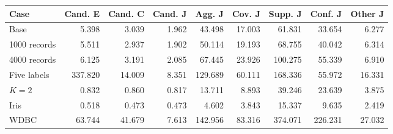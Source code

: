 \begin{table}
\label{tab:candidate-phases}
\begin{tabular}{lrrrrrrrr}
\toprule
Case & Cand. E & Cand. C & Cand. J & Agg. J & Cov. J & Supp. J & Conf. J & Other J \\
\midrule
Base & 5.398 & 3.039 & 1.962 & 43.498 & 17.003 & 61.831 & 33.654 & 6.277 \\
1000 records & 5.511 & 2.937 & 1.902 & 50.114 & 19.193 & 68.755 & 40.042 & 6.314 \\
4000 records & 6.125 & 3.191 & 2.085 & 67.445 & 23.926 & 100.275 & 55.339 & 6.910 \\
Five labels & 337.820 & 14.009 & 8.351 & 129.689 & 60.111 & 168.336 & 55.972 & 16.331 \\
$K=2$ & 0.832 & 0.860 & 0.817 & 13.711 & 8.893 & 39.246 & 23.639 & 3.875 \\
Iris & 0.518 & 0.473 & 0.473 & 4.602 & 3.843 & 15.337 & 9.635 & 2.419 \\
WDBC & 63.744 & 41.679 & 7.613 & 142.956 & 83.316 & 374.071 & 226.231 & 27.032 \\
\bottomrule
\end{tabular}
\end{table}
